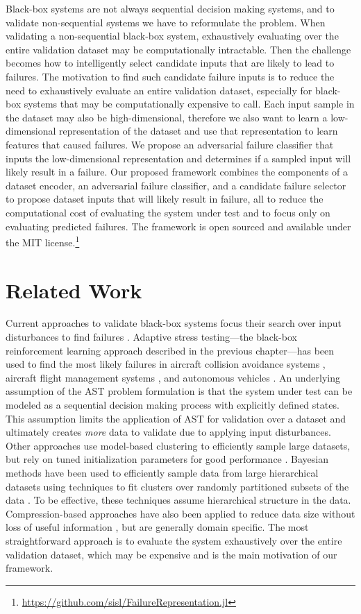 Black-box systems are not always sequential decision making systems, and to validate non-sequential systems we have to reformulate the problem.
When validating a non-sequential black-box system, exhaustively evaluating over the entire validation dataset may be computationally intractable.
Then the challenge becomes how to intelligently select candidate inputs that are likely to lead to failures.
The motivation to find such candidate failure inputs is to reduce the need to exhaustively evaluate an entire validation dataset, especially for black-box systems that may be computationally expensive to call.
Each input sample in the dataset may also be high-dimensional, therefore we also want to learn a low-dimensional representation of the dataset and use that representation to learn features that caused failures.
We propose an adversarial failure classifier that inputs the low-dimensional representation and determines if a sampled input will likely result in a failure.
Our proposed framework combines the components of a dataset encoder, an adversarial failure classifier, and a candidate failure selector to propose dataset inputs that will likely result in failure, all to reduce the computational cost of evaluating the system under test and to focus only on evaluating predicted failures.
The framework is open sourced and available under the MIT license.\footnote{\url{https://github.com/sisl/FailureRepresentation.jl}}

\section{Related Work}
Current approaches to validate black-box systems focus their search over input disturbances to find failures \citep{corso2020survey}.
Adaptive stress testing---the black-box reinforcement learning approach described in the previous chapter---has been used to find the most likely failures in aircraft collision avoidance systems \citep{lee2015adaptive, lee2020adaptive}, aircraft flight management systems \citep{moss2020adaptive}, and autonomous vehicles \citep{koren2018adaptive, koren2019efficient}.
An underlying assumption of the AST problem formulation is that the system under test can be modeled as a sequential decision making process with explicitly defined states.
This assumption limits the application of AST for validation over a dataset and ultimately creates \textit{more} data to validate due to applying input disturbances.
Other approaches use model-based clustering to efficiently sample large datasets, but rely on tuned initialization parameters for good performance \citep{wehrens2004model}.
Bayesian methods have been used to efficiently sample data from large hierarchical datasets using techniques to fit clusters over randomly partitioned subsets of the data \citep{huang2005sampling}.
To be effective, these techniques assume hierarchical structure in the data. 
Compression-based approaches have also been applied to reduce data size without loss of useful information \citep{ferrari2013handling}, but are generally domain specific.
The most straightforward approach is to evaluate the system exhaustively over the entire validation dataset, which may be expensive and is the main motivation of our framework.



